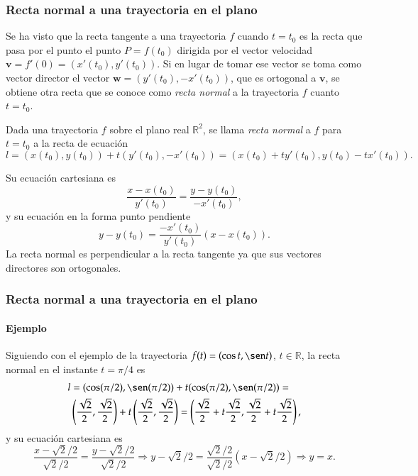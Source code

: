 \begin{frame}
\frametitle{Recta normal a una trayectoria en el plano}
Se ha visto que la recta tangente a una trayectoria $f$ cuando $t=t_0$ es la recta que pasa por el punto el punto
$P=f(t_0)$ dirigida por el vector velocidad $\mathbf{v}=f'(0)=(x'(t_0),y'(t_0))$. Si en lugar de tomar ese vector se
toma como vector director el vector $\mathbf{w}=(y'(t_0),-x'(t_0))$, que es ortogonal a $\mathbf{v}$, se obtiene otra
recta que se conoce como \emph{recta normal} a la trayectoria $f$ cuanto $t=t_0$.
\begin{definicion}
Dada una trayectoria $f$ sobre el plano real $\mathbb{R}^2$, se llama \emph{recta normal} a $f$ para $t=t_0$ a la recta de ecuación 
\[
l = (x(t_0),y(t_0))+t(y'(t_0),-x'(t_0)) = (x(t_0)+ty'(t_0),y(t_0)-tx'(t_0)). 
\]
\end{definicion}
Su ecuación cartesiana es
\[
\frac{x-x(t_0)}{y'(t_0)} = \frac{y-y(t_0)}{-x'(t_0)},
\]
y su ecuación en la forma punto pendiente
\[
y-y(t_0) = \frac{-x'(t_0)}{y'(t_0)}(x-x(t_0)).
\]
La recta normal es perpendicular a la recta tangente ya que sus vectores directores son ortogonales. 
\end{frame}


\begin{frame}
\frametitle{Recta normal a una trayectoria en el plano}
\framesubtitle{Ejemplo}
Siguiendo con el ejemplo de la trayectoria $f(t) = (\cos t,\sen t)$, $t\in \mathbb{R}$, la recta normal en el instante $t=\pi/4$ es
\begin{align*}
l&= (\cos(\pi/2),\sen(\pi/2))+t(\cos(\pi/2),\sen(\pi/2)) =\\
& \left(\frac{\sqrt{2}}{2},\frac{\sqrt{2}}{2}\right)+t\left(\frac{\sqrt{2}}{2},\frac{\sqrt{2}}{2}\right)
=\left(\frac{\sqrt{2}}{2}+t\frac{\sqrt{2}}{2},\frac{\sqrt{2}}{2}+t\frac{\sqrt{2}}{2}\right),
\end{align*}
y su ecuación cartesiana es
\[
\frac{x-\sqrt{2}/2}{\sqrt{2}/2} = \frac{y-\sqrt{2}/2}{\sqrt{2}/2}\Rightarrow y-\sqrt{2}/2 = \frac{\sqrt{2}/2}{\sqrt{2}/2}(x-\sqrt{2}/2) \Rightarrow y=x.
\]
\begin{center}
\scalebox{0.8}{}
\end{center}  
\end{frame}


